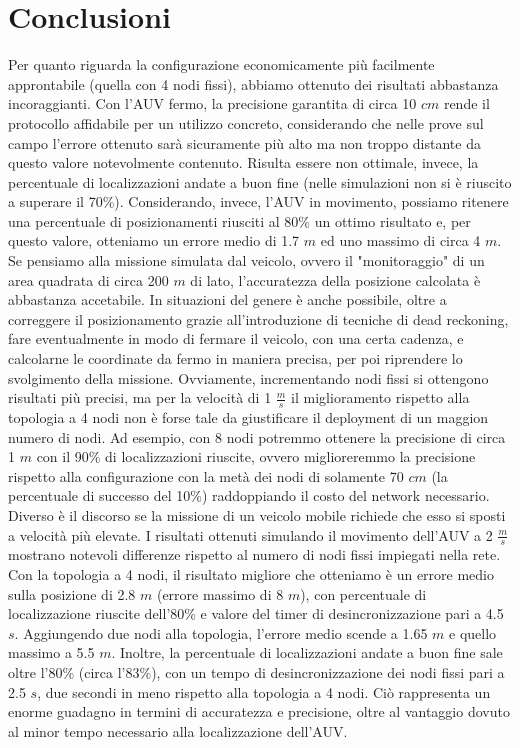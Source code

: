 \documentclass[Lau,binding=0.6cm]{sapthesis}
\begin{document}
\section{Conclusioni}
Per quanto riguarda la configurazione economicamente più facilmente approntabile (quella con 4 nodi fissi), abbiamo ottenuto dei risultati abbastanza incoraggianti. Con l'AUV fermo, la precisione garantita di circa 10 $cm$ rende il protocollo affidabile per un utilizzo concreto, considerando che nelle prove sul campo l'errore ottenuto sarà sicuramente più alto ma non troppo distante da questo valore notevolmente contenuto.
Risulta essere non ottimale, invece, la percentuale di localizzazioni andate a buon fine (nelle simulazioni non si è riuscito a superare il  70\%). Considerando, invece, l'AUV in movimento, possiamo ritenere una percentuale di posizionamenti riusciti al 80\% un ottimo risultato e, per questo valore, otteniamo un errore medio di 1.7 $m$ ed uno massimo di circa 4 $m$. Se pensiamo alla missione simulata dal veicolo, ovvero il "monitoraggio" di un area quadrata di circa 200 $m$ di lato, l'accuratezza della posizione calcolata è abbastanza accetabile. In situazioni del genere è anche possibile, oltre a correggere il posizionamento grazie all'introduzione di tecniche di dead reckoning, fare eventualmente in modo di fermare il veicolo, con una certa cadenza, e calcolarne le coordinate da fermo in maniera precisa, per poi riprendere lo svolgimento della missione.
\newline
Ovviamente, incrementando nodi fissi si ottengono risultati più precisi, ma per la velocità di 1 $\frac{m}{s}$ il miglioramento rispetto alla topologia a 4 nodi non è forse tale da giustificare il deployment di un maggion numero di nodi.
Ad esempio, con 8 nodi potremmo ottenere la precisione di circa 1 $m$ con il 90\% di localizzazioni riuscite, ovvero miglioreremmo la precisione rispetto alla configurazione con la metà dei nodi di solamente 70 $cm$ (la percentuale di successo del 10\%) raddoppiando il costo del network necessario.
Diverso è il discorso se la missione di un veicolo mobile richiede che esso si sposti a velocità più elevate. I risultati ottenuti simulando il movimento dell'AUV a 2 $\frac{m}{s}$ mostrano notevoli differenze rispetto al numero di nodi fissi impiegati nella rete.
Con la topologia a 4 nodi, il risultato migliore che otteniamo è un errore medio sulla posizione di 2.8 $m$ (errore massimo di 8 $m$), con percentuale di localizzazione riuscite dell'80\% e valore del timer di desincronizzazione pari a 4.5 $s$.
Aggiungendo due nodi alla topologia, l'errore medio scende a 1.65 $m$ e quello massimo a 5.5 $m$. Inoltre, la percentuale di localizzazioni andate a buon fine sale oltre l'80\% (circa l'83\%), con un tempo di desincronizzazione dei nodi fissi pari a 2.5 $s$, due secondi in meno rispetto alla topologia a 4 nodi. Ciò rappresenta un enorme guadagno in termini di accuratezza e precisione, oltre al vantaggio dovuto al minor tempo necessario alla localizzazione dell'AUV.
\end{document}
